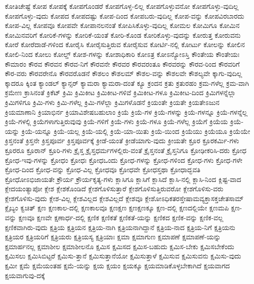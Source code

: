 {ಕೋತಿಚೇಷ್ಟೆ
ಕೋಪ
ಕೋಪಕ್ಕೆ
ಕೋಪಗೊಂಡರೆ
ಕೋಪಗೊಳ್ಳ-ಲಿಲ್ಲ
ಕೋಪಗೊಳ್ಳುವನೋ
ಕೋಪಗೊಳ್ಳು-ವುದಿಲ್ಲ
ಕೋಪಗೊಳ್ಳು-ವುದು
ಕೋಪದ
ಕೋಪದಷ್ಟು
ಕೋಪ-ದಿಂದ
ಕೋಪಬರು-ವುದಿಲ್ಲ
ಕೋಪ-ವನ್ನು
ಕೋಪವಿರಬಾರದು
ಕೋಪ-ವಿಲ್ಲ
ಕೋಪವೂ
ಕೋಪವೇ
ಕೋಪಾನಲನಂತೆ
ಕೋಪಿಸಿಕೊಳ್ಳು-ವುದಿಲ್ಲ
ಕೋಮಲ
ಕೋಮಿಗೂ
ಕೋಮಿನ
ಕೋಮಿನವರಿಗೆ
ಕೋರಿಕೆ-ಗಳನ್ನು
ಕೋರಿಕೆ-ಯಂತೆ
ಕೋರಿ-ಕೊಂಡ
ಕೋರಿಕೊಳ್ಳು-ವುದನ್ನು
ಕೋರುತ್ತ
ಕೋರುವನು
ಕೋರೆ
ಕೋರೆದಾಡೆ-ಗಳಿಂದ
ಕೋರೈಸಿ
ಕೋರೈಸುತ್ತಿರುವ
ಕೋರೈಸುವ
ಕೋರ್ಟಿ-ನಲ್ಲಿ
ಕೋರ್ಟು
ಕೋಲನ್ನು
ಕೋಲಿನ
ಕೋಲಿ-ನಿಂದ
ಕೋಲು
ಕೋಲ್ಡ್
ಕೋಶ-ಗಳನ್ನು
ಕೋಶಾಧಿಕಾರಿ
ಕೋಽತ್ರ
ಕೋಽನ್ಯೋಽಸ್ತಿ
ಕೌಂತೇಯ
ಕೌಂತೇಯಃ
ಕೌಮಾರಂ
ಕೌರವ
ಕೌರವನ
ಕೌರವ-ನಿಗೆ
ಕೌರವನೇ
ಕೌರವರ
ಕೌರವರಂತೂ
ಕೌರವರನ್ನು
ಕೌರವ-ರಿಂದ
ಕೌರವರಿಗೆ
ಕೌರ-ವರು
ಕೌರವರೇನೊ
ಕೌರವರೊಡನೆ
ಕೌಶಲಂ
ಕೌಶಲಮ್
ಕೌಶಲ-ವನ್ನು
ಕೌಶಲವೇ
ಕೌಶಲ್ಯವೇ
ಕ್ಕಾಗು-ವುದಿಲ್ಲ
ಕ್ಕಾದರೂ
ಕ್ಕಿಂತ
ಕ್ಯಾಂಡಲ್
ಕ್ಯಾನ್ಸರ್
ಕ್ಯಾಮರಾ
ಕ್ಯಾಮರಾ-ದಂತೆ
ಕ್ಯೂ
ಕ್ರಂದನ
ಕ್ರತು
ಕ್ರತುರಹಂ
ಕ್ರಮ-ಗಳೆಲ್ಲ
ಕ್ರಮ-ವಾಗಿ
ಕ್ರಮೇಣ
ಕ್ರಾಸಿನಂತೆ
ಕ್ರಿಕೆಟ್
ಕ್ರಿಮಿ
ಕ್ರಿಮಿಕೀಟ
ಕ್ರಿಮಿಕೀಟ-ಗಳಿವೆ
ಕ್ರಿಮಿಕೀಟ-ಗಳೂ
ಕ್ರಿಮಿಕೀಟ-ದಿಂದ
ಕ್ರಿಮಿಗಳನ್ನೆಲ್ಲಾ
ಕ್ರಿಮಿಗಳಿಗೂ
ಕ್ರಿಮಿ-ಗಳು
ಕ್ರಿಮಿ-ಗಳೆಲ್ಲ
ಕ್ರಿಮಿ-ಗಳೆಲ್ಲಾ
ಕ್ರಿಮಿಗಳೊಡನೆ
ಕ್ರಿಯಂತೇ
ಕ್ರಿಯತೇ
ಕ್ರಿಯತೇಽಜುನ
ಕ್ರಿಯಮಾಣಾನಿ
ಕ್ರಿಯಾಭಿರ್ನ
ಕ್ರಿಯಾವಿಶೇಷಬಹುಲಾಂ
ಕ್ರಿಯೆ
ಕ್ರಿಯೆ-ಗಳ
ಕ್ರಿಯೆ-ಗಳನ್ನು
ಕ್ರಿಯೆ-ಗಳನ್ನೂ
ಕ್ರಿಯೆ-ಗಳನ್ನೆಲ್ಲ
ಕ್ರಿಯೆ-ಗಳಲ್ಲಿ
ಕ್ರಿಯೆಗಳಾಗುತ್ತಿರುವುವು
ಕ್ರಿಯೆ-ಗಳಿಗೆ
ಕ್ರಿಯೆ-ಗಳು
ಕ್ರಿಯೆ-ಗಳೂ
ಕ್ರಿಯೆ-ಗಳೆಲ್ಲ
ಕ್ರಿಯೆಗೆ
ಕ್ರಿಯೆಯ
ಕ್ರಿಯೆ-ಯನ್ನು
ಕ್ರಿಯೆ-ಯನ್ನೂ
ಕ್ರಿಯೆ-ಯಲ್ಲ
ಕ್ರಿಯೆ-ಯಲ್ಲಿ
ಕ್ರಿಯೆ-ಯಾ-ಯಿತು
ಕ್ರಿಯೆ-ಯಿಂದ
ಕ್ರಿಯೆಯು
ಕ್ರಿಯೆಯೂ
ಕ್ರಿಯೆಯೇ
ಕ್ರಿಸ್ತನಂತೆ
ಕ್ರಿಸ್ತನೇ
ಕ್ರಿಸ್ತಪೂರ್ವ
ಕ್ರಿಸ್ತಪೂರ್ವಕ್ಕೆ
ಕ್ರೀಡೆ-ಯಂತೆ
ಕ್ರೀಡೆಯಾಗು-ವುದು
ಕ್ರೀಯತೇ
ಕ್ರೂರ
ಕ್ರೂರಕರ್ಮಿ-ಗಳು
ಕ್ರೂರರೂ
ಕ್ರೂರಾನ್
ಕ್ರೂರಿ-ಗಳು
ಕ್ರೈಸ್ತ
ಕ್ರೈಸ್ತಧರ್ಮಗಳಲ್ಲಿರು-ವಂತೆ
ಕ್ರೈಸ್ತನಂತೆ
ಕ್ರೈಸ್ತನಿಗೂ
ಕ್ರೋಢೀಕರಿಸಿ-ದರು
ಕ್ರೋಧ
ಕ್ರೋಧ-ಇವು-ಗಳನ್ನು
ಕ್ರೋಧಂ
ಕ್ರೋಧಃ
ಕ್ರೋಧಒಂದು
ಕ್ರೋಧ-ಗಳನ್ನು
ಕ್ರೋಧ-ಗಳಿಂದ
ಕ್ರೋಧ-ಗಳು
ಕ್ರೋಧ-ಗಳೇ
ಕ್ರೋಧ-ದಿಂದ
ಕ್ರೋಧ-ವನ್ನು
ಕ್ರೋಧ-ವಿಲ್ಲ
ಕ್ರೋಧವೂ
ಕ್ರೋಧವೇ
ಕ್ರೋಧಸ್ತಥಾ
ಕ್ರೋಧಾದ್ಭವತಿ
ಕ್ರೋಧೋಽಭಿಜಾಯತೇ
ಕ್ರೌರ್ಯ
ಕ್ರೌರ್ಯಕೃತ್ಯ-ಗಳು
ಕ್ಲಾಸಿಗೂ
ಕ್ಲಾಸಿಗೆ
ಕ್ಲಾಸಿದೆ
ಕ್ಲಾಸಿ-ನಲ್ಲಿ
ಕ್ಲಾಸಿ-ನಿಂದ
ಕ್ಲಿಷ್ಟ-ವಾದ
ಕ್ಲೇದಯಂತ್ಯಾಪೋ
ಕ್ಲೇಶ
ಕ್ಲೇಶಕೊಂಡಿದೆ
ಕ್ಲೇಶಗೊಳಿಸುತ್ತಾರೆ
ಕ್ಲೇಶಗೊಳಿಸುತ್ತಿರುವರೋ
ಕ್ಲೇಶಗೊಳಿಸು-ವರು
ಕ್ಲೇಶಗೊಳಿಸು-ವುದು
ಕ್ಲೇಶ-ವಿಲ್ಲ
ಕ್ಲೇಶವಿಲ್ಲದ
ಕ್ಲೇಶವಿಲ್ಲದೆ
ಕ್ಲೇಶವೂ
ಕ್ಲೇಶೋಽಧಿಕತರಸ್ತೇಷಾಮವ್ಯಕ್ತಾಸಕ್ತಚೇತಸಾಮ್
ಕ್ಲೈಬ್ಯಂ
ಕ್ವಚಿತ್
ಕ್ಷಣ
ಕ್ಷಣಕಾಲ-ದಲ್ಲಿ
ಕ್ಷಣಕಾಲವೂ
ಕ್ಷಣಕ್ಷಣ
ಕ್ಷಣಕ್ಷಣಕ್ಕೂ
ಕ್ಷಣ-ದಲ್ಲಿ
ಕ್ಷಣದಲ್ಲಿಯೇ
ಕ್ಷಣಮಪಿ
ಕ್ಷಣ-ವನ್ನು
ಕ್ಷಣವೂ
ಕ್ಷಣವೇ
ಕ್ಷಣಾರ್ಧ-ದಲ್ಲಿ
ಕ್ಷಣಿಕ
ಕ್ಷಣಿಕತೆ
ಕ್ಷಣಿಕತೆ-ಯನ್ನು
ಕ್ಷಣಿಕದ
ಕ್ಷಣಿಕ-ವನ್ನು
ಕ್ಷಣಿಕ-ವಲ್ಲ
ಕ್ಷಣಿಕವಾಗಿರು-ವುದು
ಕ್ಷತ್ರಿಯ
ಕ್ಷತ್ರಿಯನ
ಕ್ಷತ್ರಿಯ-ನಾಗಿ
ಕ್ಷತ್ರಿಯನಾಗಿದ್ದಾನೆ
ಕ್ಷತ್ರಿಯ-ನಾದ
ಕ್ಷತ್ರಿಯ-ನಿಗೆ
ಕ್ಷತ್ರಿಯನು
ಕ್ಷತ್ರಿಯರ
ಕ್ಷತ್ರಿಯರಿಗೆ
ಕ್ಷತ್ರಿಯರು
ಕ್ಷತ್ರಿಯಸ್ಯ
ಕ್ಷತ್ರಿಯಾಃ
ಕ್ಷಮಾ
ಕ್ಷಮಾಗುಣ
ಕ್ಷಮಾಪಣೆ
ಕ್ಷಮಾಪಣೆ-ಯನ್ನು
ಕ್ಷಮಾರ್ಹನಲ್ಲ
ಕ್ಷಮಾಶೀಲ
ಕ್ಷಮಾಶೀಲನೊ
ಕ್ಷಮಿಸ
ಕ್ಷಮಿಸದ
ಕ್ಷಮಿಸ-ಬಹುದು
ಕ್ಷಮಿಸ-ಬೇಕು
ಕ್ಷಮಿಸಬೇಕೆಂದು
ಕ್ಷಮಿಸಲು
ಕ್ಷಮಿಸಿಬಿಟ್ಟರೆ
ಕ್ಷಮಿಸು-ತ್ತಾನೆ
ಕ್ಷಮಿಸುತ್ತಾನೆಯೋ
ಕ್ಷಮಿಸುತ್ತಾಳೆ
ಕ್ಷಮಿಸುವ
ಕ್ಷಮಿಸುವನು
ಕ್ಷಮಿಸು-ವುದು
ಕ್ಷಮೀ
ಕ್ಷಮೆ
ಕ್ಷಮೆಯಂತಹ
ಕ್ಷಮೆ-ಯನ್ನು
ಕ್ಷಯ
ಕ್ಷಯಂ
ಕ್ಷಯಕ್ಕೂ
ಕ್ಷಯಮಾಡಿಕೊಳ್ಳಬೇಕಾಗಿದೆ
ಕ್ಷಯವಾಗದ
ಕ್ಷಯವಾಗುವು-ದಕ್ಕೆ
}
